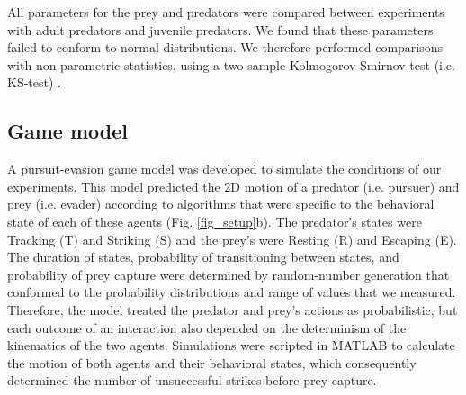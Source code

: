 \documentclass[]{rsos}%
\begin{document}
All parameters for the prey and predators were compared between experiments with adult predators and juvenile predators.
We found that these parameters failed to conform to normal distributions.
We therefore performed comparisons with non-parametric statistics, using a two-sample Kolmogorov-Smirnov test (i.e. KS-test) \cite{MasseyJr:1951jo}. 


\subsection{Game model}
A pursuit-evasion game model was developed to simulate the conditions of our experiments. 
This model predicted the 2D motion of a predator (i.e. pursuer) and prey (i.e. evader) \cite{Isaacs:1965uz} according to algorithms that were specific to the behavioral state of each of these agents (Fig. \ref{fig_setup}b). 
The predator's states were Tracking (T) and Striking (S) and the prey's were Resting (R) and Escaping (E). 
The duration of states, probability of transitioning between states, and probability of prey capture were determined by random-number generation that conformed to the probability distributions and range of values that we measured.
Therefore, the model treated the predator and prey's actions as probabilistic, but each outcome of an interaction also depended on the determinism of the kinematics of the two agents.
Simulations were scripted in MATLAB to calculate the motion of both agents and their behavioral states, which consequently determined the number of unsuccessful strikes before prey capture.
\end{document}

